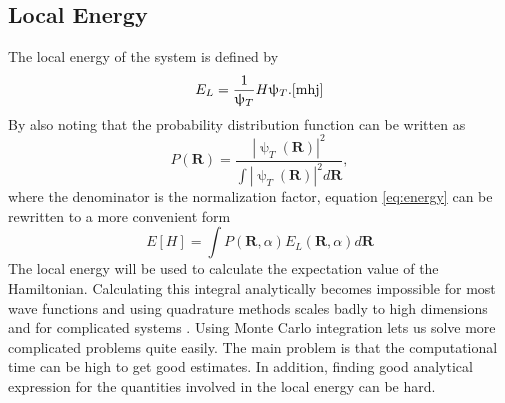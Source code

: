 \subsection{Local Energy}
The local energy of the system is defined by 
\begin{equation}
    E_L = \frac{1}{\uppsi_T}H\uppsi_T.
    \label{eq:localEnergy} \cite{mhj}
\end{equation}
By also noting that the probability distribution function can be written as 
\begin{equation}
    P(\boldsymbol{R}) = \frac{|\uppsi_T(\boldsymbol{R})|^2}{\int |\uppsi_T(\boldsymbol{R})|^2 d\boldsymbol{R} },
\end{equation}
where the denominator is the normalization factor,
equation \ref{eq:energy} can be rewritten to a more convenient form 
\begin{equation}
    E[H] = \int P(\boldsymbol{R}, \alpha)E_L(\boldsymbol{R },\alpha)d\boldsymbol{R}
\end{equation}
The local energy will be used to calculate the expectation value of the Hamiltonian. Calculating this integral analytically becomes impossible for most wave functions and using quadrature methods scales badly to high dimensions and for complicated systems \cite{compstat}. Using Monte Carlo integration lets us solve more complicated problems quite easily. The main problem is that the computational time can be high to get good estimates. In addition, finding good analytical expression for the quantities involved in the local energy can be hard.  
\\

